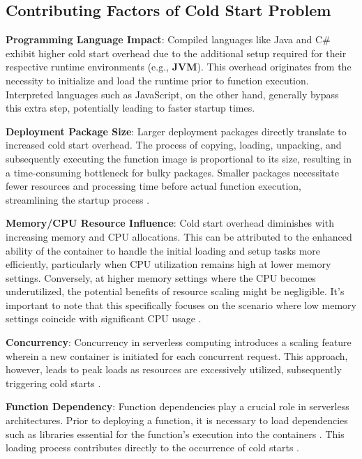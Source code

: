 \subsection{Contributing Factors of Cold Start Problem}

\textbf{Programming Language Impact}: Compiled languages like Java and C\# exhibit higher cold start overhead due to the additional setup required for their respective runtime environments (e.g., \textbf {\ac{JVM}}). This overhead originates from the necessity to initialize and load the runtime prior to function execution. Interpreted languages such as JavaScript, on the other hand, generally bypass this extra step, potentially leading to faster startup times\cite{MEHW18}.

\textbf{Deployment Package Size}: Larger deployment packages directly translate to increased cold start overhead. The process of copying, loading, unpacking, and subsequently executing the function image is proportional to its size, resulting in a time-consuming bottleneck for bulky packages. Smaller packages necessitate fewer resources and processing time before actual function execution, streamlining the startup process \cite{MEHW18}.

\textbf{Memory/CPU Resource Influence}: Cold start overhead diminishes with increasing memory and CPU allocations. This can be attributed to the enhanced ability of the container to handle the initial loading and setup tasks more efficiently, particularly when CPU utilization remains high at lower memory settings. Conversely, at higher memory settings where the CPU becomes underutilized, the potential benefits of resource scaling might be negligible. It's important to note that this specifically focuses on the scenario where low memory settings coincide with significant CPU usage \cite{MEHW18}.


\textbf{Concurrency}: Concurrency in serverless computing introduces a scaling feature wherein a new container is initiated for each concurrent request. This approach, however, leads to peak loads as resources are excessively utilized, subsequently triggering cold starts \cite{MEHW18, GWK+23}.

\textbf{Function Dependency}: Function dependencies play a crucial role in serverless architectures. Prior to deploying a function, it is necessary to load dependencies such as libraries essential for the function's execution into the containers \cite{KS23}. This loading process contributes directly to the occurrence of cold starts \cite{GWK+23}.

